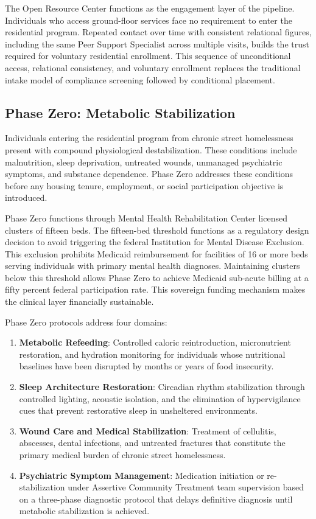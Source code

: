\documentclass[12pt, letterpaper]{article}
\begin{document}
The Open Resource Center functions as the engagement layer of the pipeline. Individuals who access ground-floor services face no requirement to enter the residential program. Repeated contact over time with consistent relational figures, including the same Peer Support Specialist across multiple visits, builds the trust required for voluntary residential enrollment. This sequence of unconditional access, relational consistency, and voluntary enrollment replaces the traditional intake model of compliance screening followed by conditional placement.

\subsection{Phase Zero: Metabolic Stabilization}

Individuals entering the residential program from chronic street homelessness present with compound physiological destabilization. These conditions include malnutrition, sleep deprivation, untreated wounds, unmanaged psychiatric symptoms, and substance dependence. Phase Zero addresses these conditions before any housing tenure, employment, or social participation objective is introduced.

Phase Zero functions through Mental Health Rehabilitation Center licensed clusters of fifteen beds. The fifteen-bed threshold functions as a regulatory design decision to avoid triggering the federal Institution for Mental Disease Exclusion. This exclusion prohibits Medicaid reimbursement for facilities of 16 or more beds serving individuals with primary mental health diagnoses. Maintaining clusters below this threshold allows Phase Zero to achieve Medicaid sub-acute billing at a fifty percent federal participation rate. This sovereign funding mechanism makes the clinical layer financially sustainable.

Phase Zero protocols address four domains:

\begin{enumerate}
    \item \textbf{Metabolic Refeeding}: Controlled caloric reintroduction, micronutrient restoration, and hydration monitoring for individuals whose nutritional baselines have been disrupted by months or years of food insecurity.
    \item \textbf{Sleep Architecture Restoration}: Circadian rhythm stabilization through controlled lighting, acoustic isolation, and the elimination of hypervigilance cues that prevent restorative sleep in unsheltered environments.
    \item \textbf{Wound Care and Medical Stabilization}: Treatment of cellulitis, abscesses, dental infections, and untreated fractures that constitute the primary medical burden of chronic street homelessness.
    \item \textbf{Psychiatric Symptom Management}: Medication initiation or re-stabilization under Assertive Community Treatment team supervision based on a three-phase diagnostic protocol that delays definitive diagnosis until metabolic stabilization is achieved.
\end{enumerate}
\end{document}
